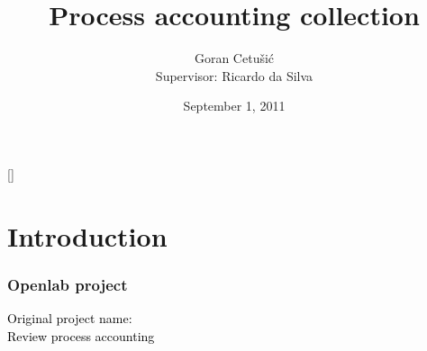 \documentclass{beamer}
\title{Process accounting collection}
\author[Goran Cetušić]{Goran Cetušić\\{\small Supervisor: Ricardo da Silva}}
\institute[Openlab]{University of Zagreb \\
				CERN Openlab}
\date{September 1, 2011}
\begin{document}
{
[] %

\begin{frame}
\maketitle
\end{frame}
}

\begin{frame}
\tableofcontents
\end{frame}

\section{Introduction}
\begin{frame}[c]
\frametitle{Openlab project}
\begin{center}
\LARGE \textcolor{black}{Original project name:} \\
\LARGE \textcolor{black}{Review process accounting} \\
\end{center}
\end{frame}
\end{document}
